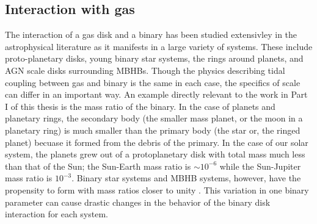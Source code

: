 	


\subsection{Interaction with gas} 
The interaction of a gas disk and a binary has been studied extensivley in the
astrophysical literature as it manifests in a large variety of systems. These
include proto-planetary disks, young binary star systems, the rings around
planets, and AGN scale disks surrounding MBHBs. Though the physics describing
tidal coupling between gas and binary is the same in each case, the specifics
of scale can differ in an important way. An example directly relevant to the
work in Part I of this thesis is the mass ratio of the binary. In the case of
planets and planetary rings, the secondary body (the smaller mass planet, or
the moon in a planetary ring) is much smaller than the primary body (the star
or, the ringed planet) becuase it formed from the debris of the primary. In
the case of our solar system, the planets grew out of a protoplanetary disk
with total mass much less than that of the Sun; the Sun-Earth mass ratio is
$\sim10^{-6}$ while the Sun-Jupiter mass ratio is $10^{-3}$. Binary star
systems and MBHB systems, however, have the propensity to form with mass
ratios closer to unity \citep{}. This variation in one binary parameter can
cause drastic changes in the behavior of the binary disk interaction for each
system.



